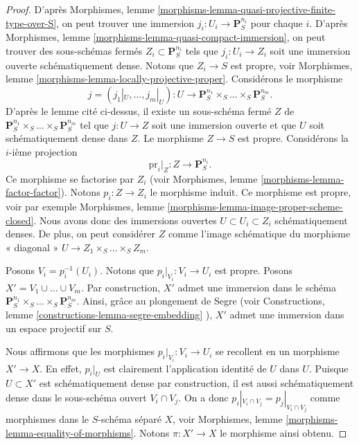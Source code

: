 \begin{proof}
\medskip\noindent
D'après Morphismes, lemme \ref{morphisms-lemma-quasi-projective-finite-type-over-S},
on peut trouver une immersion $j_i : U_i \to \mathbf{P}_S^{n_i}$
pour chaque $i$. D'après
Morphismes, lemme \ref{morphisms-lemma-quasi-compact-immersion}, on peut trouver
des sous-schémas fermés $Z_i \subset \mathbf{P}_S^{n_i}$
tels que $j_i : U_i \to Z_i$ soit une immersion ouverte
schématiquement dense. Notons que $Z_i \to S$ est propre, voir
Morphismes, lemme \ref{morphisms-lemma-locally-projective-proper}.
Considérons le morphisme
$$
j = (j_1|_U, \ldots, j_m|_U) : U \longrightarrow
\mathbf{P}_S^{n_1} \times_S \ldots \times_S \mathbf{P}_S^{n_m}.
$$
D'après le lemme cité ci-dessus, il existe un sous-schéma fermé
$Z$ de $\mathbf{P}_S^{n_1} \times_S \ldots \times_S \mathbf{P}_S^{n_m}$
tel que $j : U \to Z$ soit une immersion ouverte et que $U$
soit schématiquement dense dans $Z$. Le morphisme $Z \to S$
est propre. Considérons la $i$-ième projection
$$
\text{pr}_i|_Z : Z \longrightarrow \mathbf{P}^{n_i}_S.
$$
Ce morphisme se factorise par $Z_i$ (voir Morphismes,
lemme \ref{morphisms-lemma-factor-factor}). Notons $p_i : Z \to Z_i$
le morphisme induit. Ce morphisme est propre, voir par exemple
Morphismes, lemme \ref{morphisms-lemma-image-proper-scheme-closed}.
Nous avons donc des immersions ouvertes
$U \subset U_i \subset Z_i$ schématiquement denses.
De plus, on peut considérer $Z$ comme l'image
schématique du morphisme « diagonal »
$U \to Z_1 \times_S \ldots \times_S Z_m$.

\medskip\noindent
Posons $V_i = p_i^{-1}(U_i)$. Notons que $p_i|_{V_i} : V_i \to U_i$ est propre.
Posons $X' = V_1 \cup \ldots \cup V_m$. Par construction, $X'$ admet une immersion
dans le schéma
$\mathbf{P}^{n_1}_S \times_S \ldots \times_S \mathbf{P}^{n_m}_S$.
Ainsi, grâce au plongement de Segre (voir
Constructions, lemme \ref{constructions-lemma-segre-embedding}
), $X'$ admet
une immersion dans un espace projectif sur $S$.

\medskip\noindent
Nous affirmons que les morphismes $p_i|_{V_i}: V_i \to U_i$ se recollent en un morphisme
$X' \to X$. En effet, $p_i|_U$ est clairement l'application identité
de $U$ dans $U$. Puisque $U \subset X'$ est schématiquement dense
par construction, il est aussi schématiquement dense
dans le sous-schéma ouvert $V_i \cap V_j$. On a donc
$p_i|_{V_i \cap V_j} = p_j|_{V_i \cap V_j}$ comme morphismes dans
le $S$-schéma séparé $X$, voir
Morphismes, lemme \ref{morphisms-lemma-equality-of-morphisms}.
Notons $\pi : X' \to X$ le morphisme ainsi obtenu.


\end{proof}
